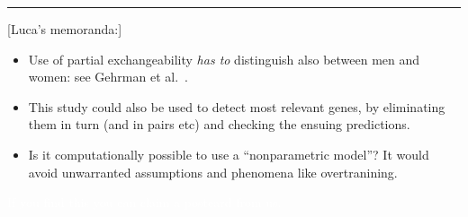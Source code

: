 \documentclass[\ifafour a4paper,12pt,\else a5paper,10pt,\fi%
onecolumn,oneside,article,%
british%
]{memoir}
\theoremstyle{remark}
\theoremstyle{innote}
\newcommand*{\citey}{\parencites*}
\newcommand*{\amp}{\&}
\newenvironment{acknowledgements}{\section*{Thanks}\addcontentsline{toc}{section}{Thanks}}{\par}
\renewcommand*{\|}{\mathpunct{|}}
\newcommand*{\etal}{{et al.}}
\begin{document}
\bigskip
\hrule
[Luca's memoranda:]
\begin{itemize}
\item Use of partial exchangeability \emph{has to} distinguish also between
  men and women: see Gehrman \etal\ \citey[p.~327]{gehrmanetal2013}.
\item This study could also be used to detect most relevant genes, by
  eliminating them in turn (and in pairs etc) and checking the ensuing
  predictions.
\item Is it computationally possible to use a \enquote{nonparametric
    model}? It would avoid unwarranted assumptions and phenomena like
  overtranining.
\end{itemize}

\textcolor{white}{If you find this you can claim a postcard from us.}
%

\renewcommand*{\appendixpagename}{Appendix}
\renewcommand*{\appendixname}{Appendix}



\printbibliography[prenote=prenote%
]
\end{document}
